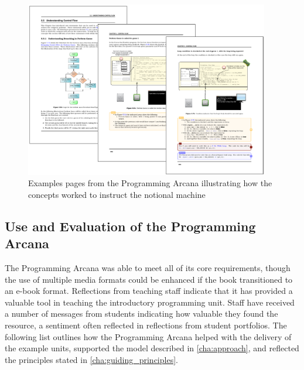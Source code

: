 \begin{figure}[p]
  \centering
  \includegraphics[width=0.95\textwidth]{ArcanaUnderstand}
  \caption{Examples pages from the Programming Arcana illustrating how the concepts worked to instruct the notional machine}
  \label{fig:arcana_understanding}
\end{figure}




\clearpage
\subsection{Use and Evaluation of the Programming Arcana} %
\label{sub:use_and_evaluation_of_the_programming_arcana}

The Programming Arcana was able to meet all of its core requirements, though the use of multiple media formats could be enhanced if the book transitioned to an e-book format. Reflections from teaching staff indicate that it has provided a valuable tool in teaching the introductory programming unit. Staff have received a number of messages from students indicating how valuable they found the resource, a sentiment often reflected in reflections from student portfolios. The following list outlines how the Programming Arcana helped with the delivery of the example units, supported the model described in \cref{cha:approach}, and reflected the principles stated in \cref{cha:guiding_principles}.


